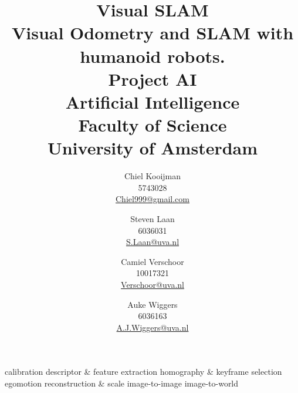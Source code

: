 \documentclass{beamer}
\author{Chiel Kooijman\\5743028\\\url{Chiel999@gmail.com} \and
Steven Laan\\6036031\\\url{S.Laan@uva.nl} \and
Camiel Verschoor\\10017321\\\url{Verschoor@uva.nl} \and
Auke Wiggers\\6036163\\\url{A.J.Wiggers@uva.nl}}
\title{Visual SLAM\\ \normalsize Visual Odometry and SLAM with humanoid
robots.\\Project AI\\Artificial Intelligence\\Faculty of Science\\ University
of Amsterdam}
\begin{document}
\begin{frame}
	calibration
	descriptor & feature extraction
	homography & keyframe selection
	egomotion
	reconstruction & scale
	image-to-image
	image-to-world
\end{frame}



\end{document}
